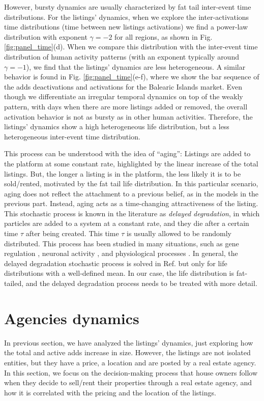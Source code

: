 However, bursty dynamics are usually characterized by fat tail inter-event time distributions. For the listings' dynamics, when we explore the inter-activations time distributions (time between new listings activations) we find a power-law distribution with exponent $\gamma = -2$ for all regions, as shown in Fig. \ref{fig:panel_time}(d). When we compare this distribution with the inter-event time distribution of human activity patterns (with an exponent typically around $\gamma = -1$), we find that the listings' dynamics are less heterogeneous. A similar behavior is found in Fig. \ref{fig:panel_time}(e-f), where we show the bar sequence of the adds deactivations and activations for the Balearic Islands market. Even though we differentiate an irregular temporal dynamics on top of the weakly pattern, with days when there are more listings added or removed, the overall activation behavior is not as bursty as in other human activities. Therefore, the listings' dynamics show a high heterogeneous life distribution, but a less heterogeneous inter-event time distribution.

This process can be understood with the idea of ``aging'': Listings are added to the platform at some constant rate, highlighted by the linear increase of the total listings. But, the longer a listing is in the platform, the less likely it is to be sold/rented, motivated by the fat tail life distribution. In this particular scenario, aging does not reflect the attachment to a previous belief, as in the models in the previous part. Instead, aging acts as a time-changing attractiveness of the listing. This stochastic process is known in the literature as \textit{delayed degradation}, in which particles are added to a system at a constant rate, and they die after a certain time $\tau$ after being created. This time $\tau$ is usually allowed to be randomly distributed. This process has been studied in many situations, such as gene regulation \cite{}, neuronal activity \cite{}, and physiological processes \cite{}. In general, the delayed degradation stochastic process is solved in Ref. \cite{LaFuerza2013} but only for life distributions with a well-defined mean. In our case, the life distribution is fat-tailed, and the delayed degradation process needs to be treated with more detail.

\section{Agencies dynamics}

In previous section, we have analyzed the listings' dynamics, just exploring how the total and active adds increase in size. However, the listings are not isolated entities, but they have a price, a location and are posted by a real estate agency. In this section, we focus on the decision-making process that house owners follow when they decide to sell/rent their properties through a real estate agency, and how it is correlated with the pricing and the location of the listings.

